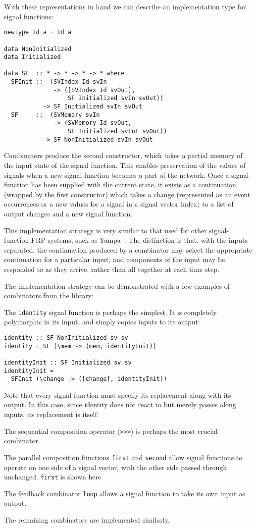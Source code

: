 With these representations in hand we can describe an implementation type for signal functions:
\begin{verbatim}
newtype Id a = Id a

data NonInitialized
data Initialized

data SF  :: * -> * -> * -> * where
  SFInit ::  (SVIndex Id svIn 
              -> ([SVIndex Id svOut],
                  SF Initialized svIn svOut)) 
           -> SF Initialized svIn svOut
  SF     ::  (SVMemory svIn 
              -> (SVMemory Id svOut,
                  SF Initialized svInt svOut)) 
           -> SF NonInitialized svIn svOut
\end{verbatim}

Combinators produce the second constructor, which takes a partial memory of the input state of the signal function.
This enables preservation of the values of signals when a new signal function becomes a part of the network. 
Once a signal function has been supplied with the current state, it exists as a continuation (wrapped by the first constructor)
which takes a change (represented as an event occurrences or a new values for a signal in a signal vector index) to 
a list of output changes and a new signal function.

This implementation strategy is very similar to that used for other signal-function FRP systems, such as Yampa~\cite{Nilsson2005}.
The distinction is that, with the inputs separated, the continuation produced by a combinator may select the appropriate continuation
for a particular input, and components of the input may be responded to as they arrive, rather than all together at each time step.

The implementation strategy can be demonstrated with a few examples of combinators from the library:

The {\tt identity} signal function is perhaps the simplest. It is completely polymorphic in its input, and simply
copies inputs to its output:
\begin{verbatim}
identity :: SF NonInitialized sv sv
identity = SF (\mem -> (mem, identityInit))

identityInit :: SF Initialized sv sv
identityInit = 
  SFInit (\change -> ([change], identityInit))
\end{verbatim}

Note that every signal function must specify its replacement along with its output.
In this case, since identity does not react to but merely passes along inputs, its replacement is itself.

The sequential composition operator ({\tt >>>}) is perhaps the most crucial combinator.

The parallel composition functions {\tt first} and {\tt second} allow signal functions to
operate on one side of a signal vector, with the other side passed through unchanged.
{\tt first} is shown here.

The feedback combinator {\tt loop} allows a signal function to take its own input as output.

The remaining combinators are implemented similarly.

